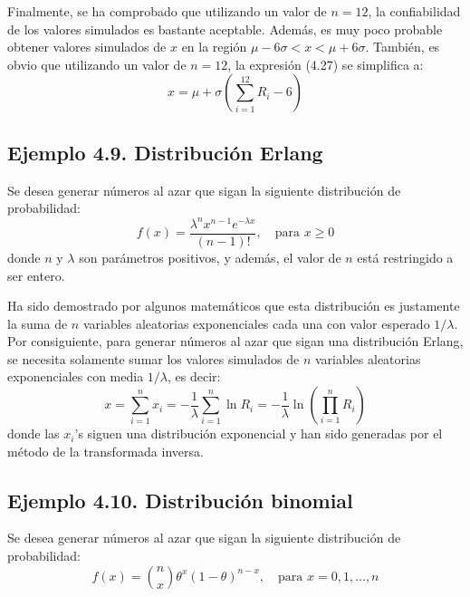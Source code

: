 \documentclass[11pt,letterpaper]{report}
\begin{document}
Finalmente, se ha comprobado que utilizando un valor de $n = 12$, la confiabilidad de los valores simulados es bastante aceptable. Además, es muy poco probable obtener valores simulados de $x$ en la región $\mu - 6\sigma < x < \mu + 6\sigma$. También, es obvio que utilizando un valor de $n = 12$, la expresión (4.27) se simplifica a:
\begin{equation}
x = \mu + \sigma \left( \sum_{i=1}^{12} R_i - 6 \right)
\end{equation}

\subsection*{Ejemplo 4.9. Distribución Erlang}
Se desea generar números al azar que sigan la siguiente distribución de probabilidad:
\begin{equation}
f(x) = \frac{\lambda^n x^{n-1} e^{-\lambda x}}{(n - 1)!}, \quad \text{para } x \ge 0
\end{equation}
donde $n$ y $\lambda$ son parámetros positivos, y además, el valor de $n$ está restringido a ser entero.

Ha sido demostrado por algunos matemáticos que esta distribución es justamente la suma de $n$ variables aleatorias exponenciales cada una con valor esperado $1/\lambda$. Por consiguiente, para generar números al azar que sigan una distribución Erlang, se necesita solamente sumar los valores simulados de $n$ variables aleatorias exponenciales con media $1/\lambda$, es decir:
\begin{equation}
x = \sum_{i=1}^n x_i = -\frac{1}{\lambda} \sum_{i=1}^n \ln R_i = -\frac{1}{\lambda} \ln \left( \prod_{i=1}^n R_i \right)
\end{equation}
donde las $x_i$'s siguen una distribución exponencial y han sido generadas por el método de la transformada inversa.

\subsection*{Ejemplo 4.10. Distribución binomial}
Se desea generar números al azar que sigan la siguiente distribución de probabilidad:
\begin{equation}
f(x) = \binom{n}{x} \theta^x (1 - \theta)^{n - x}, \quad \text{para } x = 0, 1, \dots, n
\end{equation}
\end{document}
